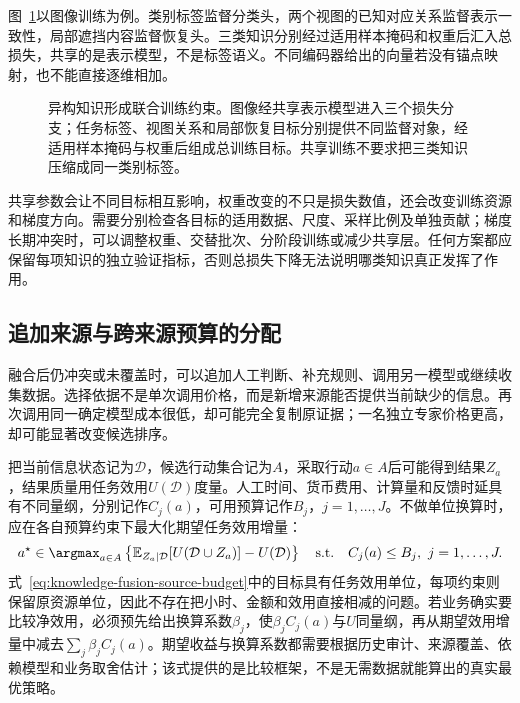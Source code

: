 图~\ref{fig:knowledge-fusion-heterogeneous-training}以图像训练为例。类别标签监督分类头，两个视图的已知对应关系监督表示一致性，局部遮挡内容监督恢复头。三类知识分别经过适用样本掩码和权重后汇入总损失，共享的是表示模型，不是标签语义。不同编码器给出的向量若没有锚点映射，也不能直接逐维相加。

\begin{figure}[htbp]
  \centering
  
  \caption{异构知识形成联合训练约束。图像经共享表示模型进入三个损失分支；任务标签、视图关系和局部恢复目标分别提供不同监督对象，经适用样本掩码与权重后组成总训练目标。共享训练不要求把三类知识压缩成同一类别标签。}
  \label{fig:knowledge-fusion-heterogeneous-training}
\end{figure}
\FloatBarrier

共享参数会让不同目标相互影响，权重改变的不只是损失数值，还会改变训练资源和梯度方向。需要分别检查各目标的适用数据、尺度、采样比例及单独贡献；梯度长期冲突时，可以调整权重、交替批次、分阶段训练或减少共享层。任何方案都应保留每项知识的独立验证指标，否则总损失下降无法说明哪类知识真正发挥了作用。

\subsection{追加来源与跨来源预算的分配}
\label{sec:knowledge-fusion-source-budget}

融合后仍冲突或未覆盖时，可以追加人工判断、补充规则、调用另一模型或继续收集数据。选择依据不是单次调用价格，而是新增来源能否提供当前缺少的信息。再次调用同一确定模型成本很低，却可能完全复制原证据；一名独立专家价格更高，却可能显著改变候选排序。

把当前信息状态记为$\mathcal{D}$，候选行动集合记为$A$，采取行动$a\in A$后可能得到结果$Z_a$，结果质量用任务效用$U(\mathcal{D})$度量。人工时间、货币费用、计算量和反馈时延具有不同量纲，分别记作$C_j(a)$，可用预算记作$B_j$，$j=1,\ldots,J$。不做单位换算时，应在各自预算约束下最大化期望任务效用增量：
\begin{equation}
  a^\star
  \in\argmax_{a\in A}
  \left\{
    \mathbb{E}_{Z_a\mid\mathcal{D}}
    [U(\mathcal{D}\cup Z_a)]
    -U(\mathcal{D})
  \right\}
  \quad
  \text{s.t.}\quad
  C_j(a)\leq B_j,\ j=1,\ldots,J.
  \label{eq:knowledge-fusion-source-budget}
\end{equation}
式~\eqref{eq:knowledge-fusion-source-budget}中的目标具有任务效用单位，每项约束则保留原资源单位，因此不存在把小时、金额和效用直接相减的问题。若业务确实要比较净效用，必须预先给出换算系数$\beta_j$，使$\beta_j C_j(a)$与$U$同量纲，再从期望效用增量中减去$\sum_j\beta_j C_j(a)$。期望收益与换算系数都需要根据历史审计、来源覆盖、依赖模型和业务取舍估计；该式提供的是比较框架，不是无需数据就能算出的真实最优策略。

